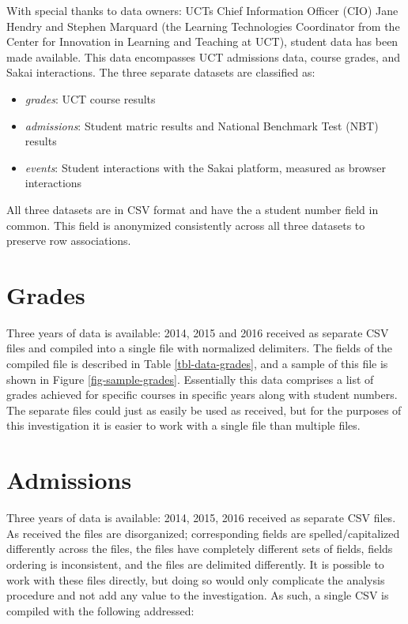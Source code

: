 With special thanks to data owners: UCTs Chief Information Officer (CIO) Jane Hendry and Stephen Marquard (the Learning Technologies Coordinator from the Center for Innovation in Learning and Teaching at UCT), student data has been made available. This data encompasses UCT admissions data, course grades, and Sakai interactions. The three separate datasets are classified as:

\begin{itemize}
    \item \textit{grades}: UCT course results
    \item \textit{admissions}: Student matric results and National Benchmark Test (NBT) results
    \item \textit{events}: Student interactions with the Sakai platform, measured as browser interactions
\end{itemize}

All three datasets are in CSV format and have the a student number field in common. This field is anonymized consistently across all three datasets to preserve row associations.

\section{Grades}
Three years of data is available: 2014, 2015 and 2016 received as separate CSV files and compiled into a single file with normalized delimiters. The fields of the compiled file is described in Table \ref{tbl-data-grades}, and a sample of this file is shown in Figure \ref{fig-sample-grades}. Essentially this data comprises a list of grades achieved for specific courses in specific years along with student numbers. The separate files could just as easily be used as received, but for the purposes of this investigation it is easier to work with a single file than multiple files.




\section{Admissions}
Three years of data is available: 2014, 2015, 2016 received as separate CSV files. As received the files are disorganized; corresponding fields are spelled/capitalized differently across the files, the files have completely different sets of fields, fields ordering is inconsistent, and the files are delimited differently. It is possible to work with these files directly, but doing so would only complicate the analysis procedure and not add any value to the investigation. As such, a single CSV is compiled with the following addressed:

